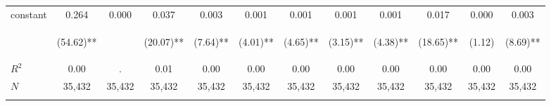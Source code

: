 \begin{tabular}{lccccccccccc}
\noalign{\smallskip}constant & 0.264 & 0.000 & 0.037 & 0.003 & 0.001 & 0.001 & 0.001 & 0.001 & 0.017 & 0.000 & 0.003\\
 & \begin{footnotesize}(54.62)**\end{footnotesize} & \begin{footnotesize}\end{footnotesize} & \begin{footnotesize}(20.07)**\end{footnotesize} & \begin{footnotesize}(7.64)**\end{footnotesize} & \begin{footnotesize}(4.01)**\end{footnotesize} & \begin{footnotesize}(4.65)**\end{footnotesize} & \begin{footnotesize}(3.15)**\end{footnotesize} & \begin{footnotesize}(4.38)**\end{footnotesize} & \begin{footnotesize}(18.65)**\end{footnotesize} & \begin{footnotesize}(1.12)\end{footnotesize} & \begin{footnotesize}(8.69)**\end{footnotesize}\\
\noalign{\smallskip}$R^2$ & 0.00 & . & 0.01 & 0.00 & 0.00 & 0.00 & 0.00 & 0.00 & 0.00 & 0.00 & 0.00\\
$N$ & 35,432 & 35,432 & 35,432 & 35,432 & 35,432 & 35,432 & 35,432 & 35,432 & 35,432 & 35,432 & 35,432\\
\noalign{\smallskip}\bottomrule\end{tabular}
